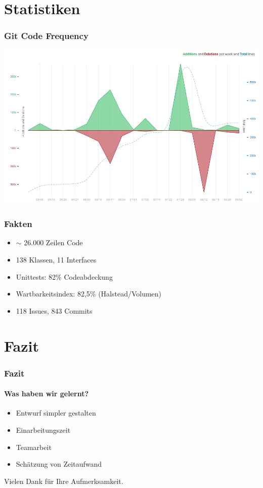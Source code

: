 \documentclass[t]{beamer}
\begin{document}
\section{Statistiken}
\begin{frame}
	\frametitle{Git Code Frequency}
	\includegraphics[scale=.33]{img/GitCodeFrequency.jpg}\\
\end{frame}
\begin{frame}[c]
	\frametitle{Fakten}
	\begin{itemize}
	\item <+-> \begin{math}\sim\end{math} 26.000 Zeilen Code %
	\item <+-> 138 Klassen, 11 Interfaces
	\item <+-> Unittests: 82\% Codeabdeckung
	\item <+-> Wartbarkeitsindex: 82,5\% (Halstead/Volumen)
	\item <+-> 118 Issues, 843 Commits 
	\end{itemize}
\end{frame}


\section{Fazit}
\begin{frame}[c]
	\frametitle{Fazit}
	\framesubtitle{Was haben wir gelernt?}
	\begin{itemize}
	\itemsep1em
	\item <+-> Entwurf simpler gestalten
	\item <+-> Einarbeitungszeit
	\item <+-> Teamarbeit
	\item <+-> Schätzung von Zeitaufwand
	\end{itemize}
\end{frame}
\begin{frame}[c]
	\begin{center}
	Vielen Dank für Ihre Aufmerksamkeit.
	\end{center}
\end{frame}
\end{document}
